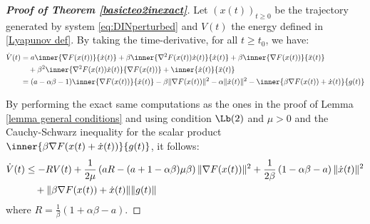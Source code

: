 \documentclass[reqno]{amsart}
\theoremstyle{plain}
\theoremstyle{definition}
\theoremstyle{remark}
\DeclarePairedDelimiter{\norm}{\lVert}{\rVert}	%
\begin{document}
\begin{proof}[\textbf{Proof of Theorem \ref{basicteo2inexact}}]
	Let $(x(t))_{t\geq 0}$ be the trajectory generated by system \eqref{eq:DINperturbed}  and $V(t)$ the energy defined in \eqref{Lyapunov def}. By taking the time-derivative, for all $t\geq t_{0}$, we have:
	\begin{equation}
		\begin{aligned}
			\dot{V}(t) & = a\inner{\nabla F(x(t))}{\dot{x}(t)} + \beta\inner{\nabla^{2}F(x(t))\dot{x}(t)}{\dot{x}(t)} +\beta\inner{\nabla F(x(t))}{\ddot{x}(t)} \\ & \quad +\beta^{2} \inner{\nabla^{2}F(x(t))\dot{x}(t)}{\nabla F(x(t))} 
			+ \inner{\dot{x}(t)}{\ddot{x}(t)} \\
			& = (a-\alpha\beta -1)\inner{\nabla F(x(t))}{\dot{x}(t)} -\beta \norm{\nabla F(x(t))}^{2} -\alpha \norm{\dot{x}(t)}^{2}  -\inner{\beta\nabla F(x(t))+\dot{x}(t)}{g(t)}
		\end{aligned}
	\end{equation}
	
	By performing the exact same computations as the ones in the proof of Lemma \ref{lemma general conditions} and using condition \hyperref[PL]{$\Lb(2)$} and $\mu>0$ and the Cauchy-Schwarz inequality for the scalar product $\inner{\beta\nabla F(x(t)+\dot{x}(t))}{g(t)}$, it follows:
	\begin{equation}\label{perturbed 1}
		\begin{aligned}
			\dot{V}(t) & \leq -RV(t) +\frac{1}{2\mu}\left(aR - (a+1-\alpha\beta )\mu\beta\right)\norm{\nabla F(x(t))}^{2} +\frac{1}{2\beta}\left(1-\alpha\beta -a\right)\norm{\dot{x}(t)}^{2}\\ & \quad +\norm{\beta\nabla F(x(t))+\dot{x}(t)}\norm{g(t)}
		\end{aligned}
	\end{equation}
	where $R=\frac{1}{\beta}(1+\alpha\beta-a)$.
	

\end{proof}
\end{document}
